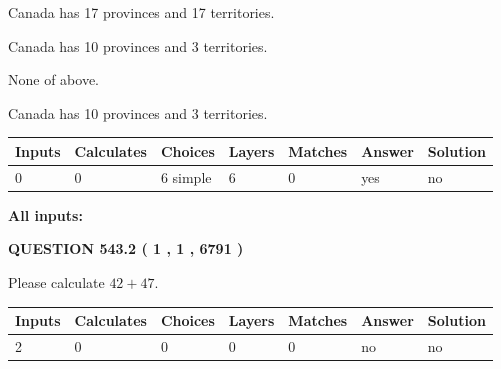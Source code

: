 \documentclass[12pt]{article}
\begin{document}
 
Canada has  17 provinces and  17 territories.
 
 
Canada has 10  provinces and 3 territories.
 
 
 None of above.
 
 
\noindent{}
 
 
Canada has 10  provinces and 3 territories.
 
 
\noindent{}
 
 
   
   
   
   
\noindent\begin{tabular}{|l|l|l|l|l|l|l|}
 \hline
Inputs & Calculates & Choices & Layers & Matches & Answer & Solution \\ \hline
 0  & 
 0  & 
 6
  simple  
  & 
 6  & 
 0  & 
  yes & 
  no 
  \\ \hline
 \end{tabular}
   
   
   
   
\noindent{}
   
   
   
   
\noindent\vspace{0.1in}\hspace{-0.08in} {\textbf{\Large{All inputs: }}}
   
   
  
\vspace{0.2in}
  
{\textbf{\Large{QUESTION
543.2 
 ( 1 , 1 , 6791 )
}}}
  
  
 
Please calculate $ %
42 +  %
47 $.
 
 
   
   
   
   
\noindent\begin{tabular}{|l|l|l|l|l|l|l|}
 \hline
Inputs & Calculates & Choices & Layers & Matches & Answer & Solution \\ \hline
 2  & 
 0  & 
 0
  & 
 0  & 
 0  & 
  no & 
  no 
  \\ \hline
 \end{tabular}
   
\end{document}
